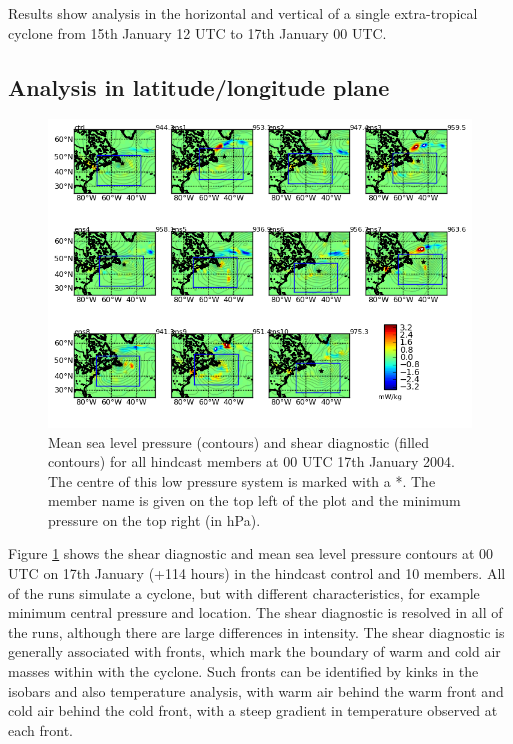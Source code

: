 Results show analysis in the horizontal and vertical of a single extra-tropical cyclone from 15th January 12 UTC to 17th January 00 UTC. 

\subsection{Analysis in latitude/longitude plane}

\begin{figure}
	\includegraphics[width=42pc,angle=0]{plot_var_poly_all_diag500_msl_00UTC_17.png} %
	\caption{Mean sea level pressure (contours) and shear diagnostic (filled contours) for all hindcast members at 00 UTC 17th January 2004. The centre of this low pressure system is marked with a *. The member name is given on the top left of the plot and the minimum pressure on the top right (in hPa). }\label{fig:HC_all}
\end{figure}

Figure \ref{fig:HC_all} shows the shear diagnostic and mean sea level pressure contours at 00 UTC on 17th January (+114 hours) in the hindcast control and 10 members. All of the runs simulate a cyclone, but with different characteristics, for example minimum central pressure and location. The shear diagnostic is resolved in all of the runs, although there are large differences in intensity. The shear diagnostic is generally associated with fronts, which mark the boundary of warm and cold air masses within with the cyclone. Such fronts can be identified by kinks in the isobars and also temperature analysis, with warm air behind the warm front and cold air behind the cold front, with a steep gradient in temperature observed at each front.

